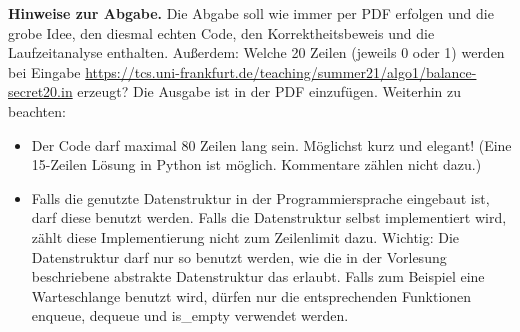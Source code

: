 \documentclass{uebung_cs}
\begin{document}
\textbf{Hinweise zur Abgabe.}
Die Abgabe soll wie immer per PDF erfolgen und die grobe Idee, den diesmal echten Code, den Korrektheitsbeweis und die Laufzeitanalyse enthalten.
Außerdem: Welche 20 Zeilen (jeweils 0 oder 1) werden bei Eingabe \url{https://tcs.uni-frankfurt.de/teaching/summer21/algo1/balance-secret20.in} erzeugt? Die Ausgabe ist in der PDF einzufügen.
Weiterhin zu beachten:
\begin{itemize}
\item Der Code darf maximal 80 Zeilen lang sein. Möglichst kurz und elegant! (Eine 15-Zeilen Lösung in Python ist möglich. Kommentare zählen nicht dazu.)
\item Falls die genutzte Datenstruktur in der Programmiersprache eingebaut ist, darf diese benutzt werden. Falls die Datenstruktur selbst implementiert wird, zählt diese Implementierung nicht zum Zeilenlimit dazu. Wichtig: Die Datenstruktur darf nur so benutzt werden, wie die in der Vorlesung beschriebene abstrakte Datenstruktur das erlaubt. Falls zum Beispiel eine Warteschlange benutzt wird, dürfen nur die entsprechenden Funktionen enqueue, dequeue und is\_empty verwendet werden.
\end{itemize}
\end{document}
